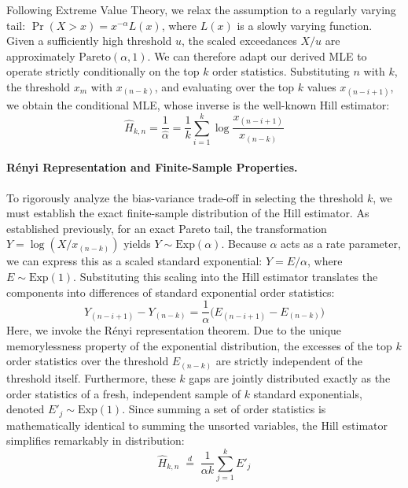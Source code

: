 \documentclass[12pt]{article}
\begin{document}
Following Extreme Value Theory, we relax the assumption to a regularly varying tail: $\Pr(X > x) = x^{-\alpha} L(x)$, where $L(x)$ is a slowly varying function. Given a sufficiently high threshold $u$, the scaled exceedances $X/u$ are approximately $\text{Pareto}(\alpha, 1)$. We can therefore adapt our derived MLE to operate strictly conditionally on the top $k$ order statistics. Substituting $n$ with $k$, the threshold $x_m$ with $x_{(n-k)}$, and evaluating over the top $k$ values $x_{(n-i+1)}$, we obtain the conditional MLE, whose inverse is the well-known Hill estimator:
%
\begin{equation}
    \hat{H}_{k,n} = \frac{1}{\hat{\alpha}} = \frac{1}{k}\sum_{i=1}^{k} \log\frac{x_{(n-i+1)}}{x_{(n-k)}}
\end{equation}

\paragraph{Rényi Representation and Finite-Sample Properties.}
To rigorously analyze the bias-variance trade-off in selecting the threshold $k$, we must establish the exact finite-sample distribution of the Hill estimator. As established previously, for an exact Pareto tail, the transformation $Y = \log(X/x_{(n-k)})$ yields $Y \sim \text{Exp}(\alpha)$. Because $\alpha$ acts as a rate parameter, we can express this as a scaled standard exponential: $Y = E/\alpha$, where $E \sim \text{Exp}(1)$. Substituting this scaling into the Hill estimator translates the components into differences of standard exponential order statistics:
%
\begin{equation}
    Y_{(n-i+1)} - Y_{(n-k)} = \frac{1}{\alpha} \big( E_{(n-i+1)} - E_{(n-k)} \big)
\end{equation}
%
Here, we invoke the Rényi representation theorem. Due to the unique memorylessness property of the exponential distribution, the excesses of the top $k$ order statistics over the threshold $E_{(n-k)}$ are strictly independent of the threshold itself. Furthermore, these $k$ gaps are jointly distributed exactly as the order statistics of a fresh, independent sample of $k$ standard exponentials, denoted $E'_j \sim \text{Exp}(1)$. Since summing a set of order statistics is mathematically identical to summing the unsorted variables, the Hill estimator simplifies remarkably in distribution:
%
\begin{equation}
    \hat{H}_{k,n} \;\overset{d}{=}\; \frac{1}{\alpha k} \sum_{j=1}^{k} E'_j
\end{equation}
\end{document}
